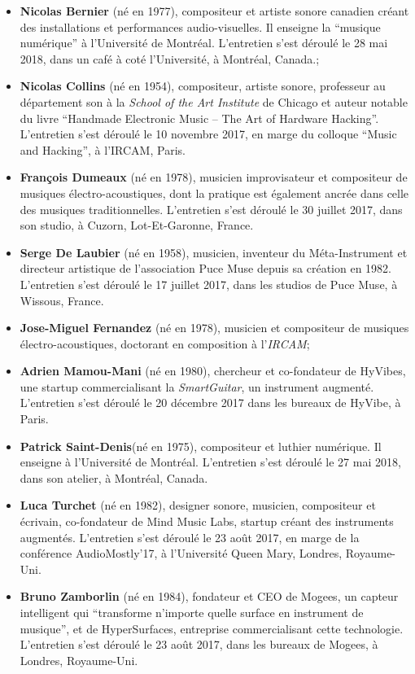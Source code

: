 \begin{itemize}[noitemsep]
\item \textbf{Nicolas Bernier} (né en 1977), compositeur et artiste sonore canadien créant des installations et performances audio-visuelles. Il enseigne la ``musique numérique'' à l'Université de Montréal. L'entretien s'est déroulé le 28 mai 2018, dans un café à coté l'Université, à Montréal, Canada.;
\item \textbf{Nicolas Collins} (né en 1954), compositeur, artiste sonore, professeur au département son à la \textit{School of the Art Institute} de Chicago et auteur notable du livre ``Handmade Electronic Music – The Art of Hardware Hacking''\cite{collins_handmade_2006}. L'entretien s'est déroulé le 10 novembre 2017, en marge du colloque ``Music and Hacking'', à l'\gls{IRCAM}, Paris.
\item \textbf{François Dumeaux} (né en 1978), musicien improvisateur  et compositeur de musiques électro-acoustiques, dont la pratique est également ancrée dans celle des musiques traditionnelles. L'entretien s'est déroulé le 30 juillet 2017, dans son studio, à Cuzorn, Lot-Et-Garonne, France.
\item \textbf{Serge De Laubier} (né en 1958), musicien, inventeur du Méta-Instrument et directeur artistique de l'association Puce Muse depuis sa création en 1982. L'entretien s'est déroulé le 17 juillet 2017, dans les studios de Puce Muse, à Wissous, France.
\item \textbf{Jose-Miguel Fernandez} (né en 1978), musicien et compositeur de musiques électro-acoustiques, doctorant en composition à l'\textit{IRCAM};
\item \textbf{Adrien Mamou-Mani} (né en 1980), chercheur et co-fondateur de HyVibes, une startup commercialisant la \textit{SmartGuitar}, un instrument augmenté. L'entretien s'est déroulé le 20 décembre 2017 dans les bureaux de HyVibe, à Paris.
\item \textbf{Patrick Saint-Denis}(né en 1975), compositeur et luthier numérique. Il enseigne à l'Université de Montréal. L'entretien s'est déroulé le 27 mai 2018, dans son atelier, à Montréal, Canada.
\item \textbf{Luca Turchet} (né en 1982), designer sonore, musicien, compositeur et écrivain, co-fondateur de Mind Music Labs, startup créant des instruments augmentés. L'entretien s'est déroulé le 23 août 2017, en marge de la conférence AudioMostly'17, à l'Université Queen Mary, Londres, Royaume-Uni.
\item \textbf{Bruno Zamborlin} (né en 1984), fondateur et CEO de Mogees, un capteur intelligent qui ``transforme n'importe quelle surface en instrument de musique'', et de HyperSurfaces, entreprise commercialisant cette technologie. L'entretien s'est déroulé le 23 août 2017, dans les bureaux de Mogees, à Londres, Royaume-Uni.
\end{itemize}



